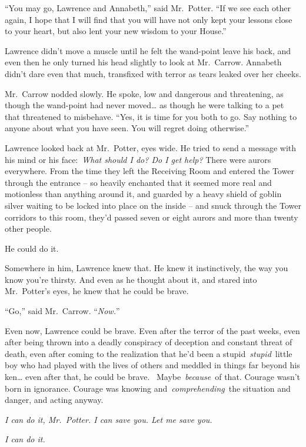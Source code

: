 ``You may go, Lawrence and Annabeth,'' said Mr.~Potter. ``If we see each
other again, I hope that I will find that you will have not only kept
your lessons close to your heart, but also lent your new wisdom to your
House.''

Lawrence didn't move a muscle until he felt the wand-point leave his
back, and even then he only turned his head slightly to look at
Mr.~Carrow. Annabeth didn't dare even that much, transfixed with terror
as tears leaked over her cheeks.

Mr.~Carrow nodded slowly. He spoke, low and dangerous and threatening,
as though the wand-point had never moved\ldots{} as though he were
talking to a pet that threatened to misbehave. ``Yes, it is time for you
both to go. Say nothing to anyone about what you have seen. You will
regret doing otherwise.''

Lawrence looked back at Mr.~Potter, eyes wide. He tried to send a
message with his mind or his face:~\emph{What should I do? Do I get
help?} There were aurors everywhere. From the time they left the
Receiving Room and entered the Tower through the entrance -- so heavily
enchanted that it seemed more real and motionless than anything around
it, and guarded by a heavy shield of goblin silver waiting to be locked
into place on the inside -- and snuck through the Tower corridors to
this room, they'd passed seven or eight aurors and more than twenty
other people.

He could do it.

Somewhere in him, Lawrence knew that. He knew it instinctively, the way
you know you're thirsty. And even as he thought about it, and stared
into Mr.~Potter's eyes, he knew that he could be brave.

``Go,'' said Mr.~Carrow. ``\emph{Now.}''

Even now, Lawrence could be brave. Even after the terror of the past
weeks, even after being thrown into a deadly conspiracy of deception and
constant threat of death, even after coming to the realization that he'd
been a stupid~\emph{stupid}~little boy who had played with the lives of
others and meddled in things far beyond his ken\ldots{} even after that,
he could be brave. ~Maybe~\emph{because}~of that. Courage wasn't born in
ignorance. Courage was knowing and~\emph{comprehending}~the situation
and danger, and acting anyway.

\emph{I can do it, Mr.~Potter. I can save you. Let me save you.}

\emph{I can do it.}

